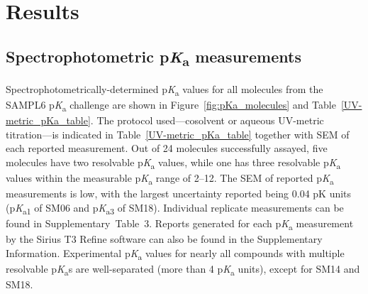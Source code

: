 \documentclass[9pt,lineno]{elife}
\newcommand{\pKa}{p\textit{K}\textsubscript{a}}
\begin{document}
\section{Results}

\subsection{Spectrophotometric \pKa{} measurements}

Spectrophotometrically-determined \pKa{} values for all molecules from the SAMPL6 \pKa{} challenge are shown in Figure~\ref{fig:pKa_molecules} and Table~\ref{UV-metric_pKa_table}. 
The protocol used---cosolvent or aqueous UV-metric titration---is indicated in Table~\ref{UV-metric_pKa_table} together with SEM of each reported measurement. 
Out of 24 molecules successfully assayed, five molecules have two resolvable \pKa{} values, while one has three resolvable \pKa{} values within the measurable \pKa{} range of 2--12. 
The SEM of reported \pKa{} measurements is low, with the largest uncertainty reported being 0.04 pK units (\pKa \textsubscript{1} of SM06 and \pKa \textsubscript{3} of SM18). 
Individual replicate measurements can be found in Supplementary~Table~3. 
Reports generated for each \pKa{} measurement by the Sirius T3 Refine software can also be found in the Supplementary Information. 
Experimental \pKa{} values for nearly all compounds with multiple resolvable \pKa s are well-separated (more than 4 \pKa{} units), except for SM14 and SM18.
\end{document}

